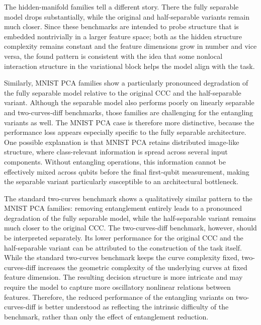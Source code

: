 \documentclass[12pt,a4paper,openany]{report}
\begin{document}
The hidden-manifold families tell a different story. There the fully separable model drops substantially, while the original and half-separable variants remain much closer. Since these benchmarks are intended to probe structure that is embedded nontrivially in a larger feature space; both as the hidden structure complexity remains constant and the feature dimensions grow in number and vice versa, the found pattern is consistent with the idea that some nonlocal interaction structure in the variational block helps the model align with the task. 

Similarly, MNIST PCA families show a particularly pronounced degradation of the fully separable model relative to the original CCC and the half-separable variant. Although the separable model also performs poorly on linearly separable and two-curves-diff benchmarks, those families are challenging for the entangling variants as well. The MNIST PCA case is therefore more distinctive, because the performance loss appears especially specific to the fully separable architecture. One possible explanation is that MNIST PCA retains distributed image-like structure, where class-relevant information is spread across several input components. Without entangling operations, this information cannot be effectively mixed across qubits before the final first-qubit measurement, making the separable variant particularly susceptible to an architectural bottleneck.

The standard two-curves benchmark shows a qualitatively similar pattern to the MNIST PCA families: removing entanglement entirely leads to a pronounced degradation of the fully separable model, while the half-separable variant remains much closer to the original CCC. The two-curves-diff benchmark, however, should be interpreted separately. Its lower performance for the original CCC and the half-separable variant can be attributed to the construction of the task itself. While the standard two-curves benchmark keeps the curve complexity fixed, two-curves-diff increases the geometric complexity of the underlying curves at fixed feature dimension. The resulting decision structure is more intricate and may require the model to capture more oscillatory nonlinear relations between features. Therefore, the reduced performance of the entangling variants on two-curves-diff is better understood as reflecting the intrinsic difficulty of the benchmark, rather than only the effect of entanglement reduction.
\end{document}
